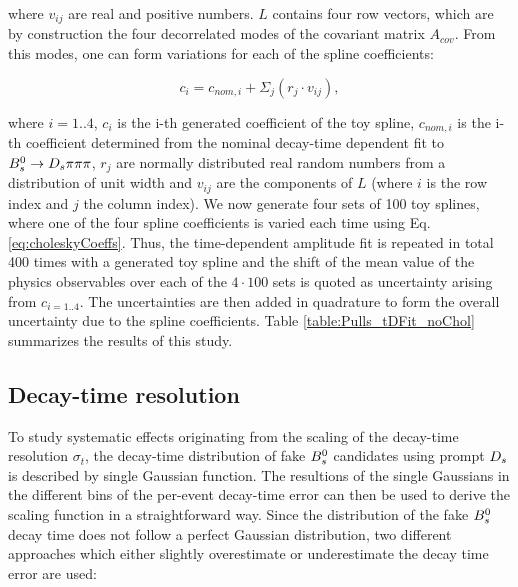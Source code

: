 where $v_{ij}$ are real and positive numbers. $L$ contains four row vectors, which are by construction the four decorrelated modes of the covariant matrix $A_{cov}$. 
From this modes, one can form variations for each of the spline coefficients:

\begin{equation}
c_{i} = c_{nom,i} + \Sigma_{j} \left(r_{j} \cdot v_{ij} \right),
\label{eq:choleskyCoeffs}
\end{equation}

where $i=1..4$, $c_{i}$ is the i-th generated coefficient of the toy spline, $c_{nom,i}$ is the i-th coefficient determined from the nominal decay-time dependent fit to ${{B}^0_{s}}\rightarrow{\ensuremath{{D}_{s}}}{\ensuremath{\pi}}{\ensuremath{\pi}}{\ensuremath{\pi}}$, 
$r_{j}$ are normally distributed real random numbers from a distribution of unit width and $v_{ij}$ are the components of $L$ (where $i$ is the row index and $j$ the column index). \newline
We now generate four sets of 100 toy splines, where one of the four spline coefficients is varied each time using Eq. \ref{eq:choleskyCoeffs}. 
Thus, the time-dependent amplitude fit is repeated in total 400 times with a generated toy spline and the shift of the mean value of the physics observables over each of the $4\cdot100$ sets is quoted as 
uncertainty arising from $c_{i=1..4}$. The uncertainties are then added in quadrature to form the overall uncertainty due to the spline coefficients. Table \ref{table:Pulls_tDFit_noChol} summarizes the results of this study.




\subsection{Decay-time resolution}

To study systematic effects originating from the scaling of the decay-time resolution $\sigma_{t}$, the decay-time distribution of fake ${{B}^0_{s}}$ candidates using prompt ${{D}_{s}}$ is described by single Gaussian function.
The resultions of the single Gaussians in the different bins of the per-event decay-time error can then be used to derive the scaling function in a straightforward way.
Since the distribution of the fake ${{B}^0_{s}}$ decay time does not follow a perfect Gaussian distribution, two different approaches which either slightly overestimate or underestimate the decay time error are used:

